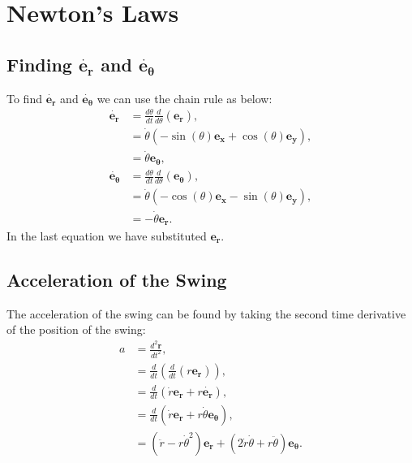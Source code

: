 \documentclass[12pt]{article}
\begin{document}



\appendix
\section{Newton's Laws}
\subsection{Finding $\dot{\mathbf{e_r}}$ and $\dot{\mathbf{e_\theta}}$}
\label{appendix:1}
To find $\dot{\mathbf{e_r}}$ and $\dot{\mathbf{e_\theta}}$ we can use the chain rule as below:
\begin{align}
    \dot{\mathbf{e_r}} &= \frac{d\theta}{dt} \frac{d}{d\theta}(\mathbf{e_r}),\\
    &= \dot{\theta}(-\sin(\theta) \mathbf{e_x} + \cos(\theta) \mathbf{e_y}),\\
    &= \dot{\theta}\mathbf{e_\theta},\\
    \dot{\mathbf{e_\theta}} &= \frac{d\theta}{dt} \frac{d}{d\theta}(\mathbf{e_\theta}),\\
    &= \dot{\theta} (-\cos(\theta) \mathbf{e_x} - \sin(\theta) \mathbf{e_y}),\\
    &= -\dot{\theta} \mathbf{e_r}.
\end{align}
In the last equation we have substituted $\mathbf{e_r}$.
\subsection{Acceleration of the Swing}
\label{appendix:acceleration_of_swing}
The acceleration of the swing can be found by taking the second time derivative of the position of the swing:
\begin{align}
    a &= \frac{d^2\mathbf{r}}{dt^2},\\
    &= \frac{d}{dt}(\frac{d}{dt}(r\mathbf{e_r})),\\
    &= \frac{d}{dt}(\dot{r} \mathbf{e_r} + r\mathbf{\dot{e_r}}),\\
    &= \frac{d}{dt}(\dot{r} \mathbf{e_r} + r\dot{\theta}\mathbf{e_\theta}),\\
    &= (\ddot{r} - r \dot{\theta}^2) \mathbf{e_r} + (2\dot{r} \dot{\theta} + r \ddot{\theta}) \mathbf{e_\theta}.
\end{align}
\end{document}
